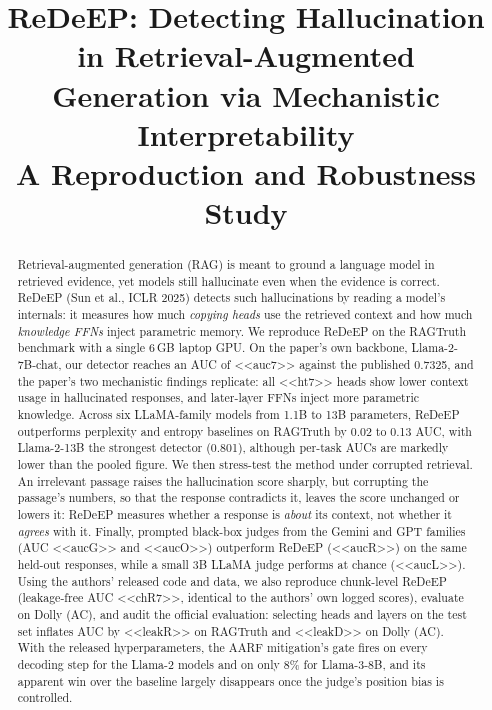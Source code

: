 \documentclass[conference]{IEEEtran}
\begin{document}
\title{ReDeEP: Detecting Hallucination in Retrieval-Augmented Generation via Mechanistic Interpretability\\[4pt]
\large A Reproduction and Robustness Study}

\author{
\and
{}
}

\maketitle

\begin{abstract}
Retrieval-augmented generation (RAG) is meant to ground a language model in retrieved evidence, yet models still hallucinate even when the evidence is correct. ReDeEP (Sun et al., ICLR 2025) detects such hallucinations by reading a model's internals: it measures how much \emph{copying heads} use the retrieved context and how much \emph{knowledge FFNs} inject parametric memory. We reproduce ReDeEP on the RAGTruth benchmark with a single 6\,GB laptop GPU. On the paper's own backbone, Llama-2-7B-chat, our detector reaches an AUC of <<auc7>> against the published 0.7325, and the paper's two mechanistic findings replicate: all <<ht7>> heads show lower context usage in hallucinated responses, and later-layer FFNs inject more parametric knowledge. Across six LLaMA-family models from 1.1B to 13B parameters, ReDeEP outperforms perplexity and entropy baselines on RAGTruth by 0.02 to 0.13 AUC, with Llama-2-13B the strongest detector (0.801), although per-task AUCs are markedly lower than the pooled figure. We then stress-test the method under corrupted retrieval. An irrelevant passage raises the hallucination score sharply, but corrupting the passage's numbers, so that the response contradicts it, leaves the score unchanged or lowers it: ReDeEP measures whether a response is \emph{about} its context, not whether it \emph{agrees} with it. Finally, prompted black-box judges from the Gemini and GPT families (AUC <<aucG>> and <<aucO>>) outperform ReDeEP (<<aucR>>) on the same held-out responses, while a small 3B LLaMA judge performs at chance (<<aucL>>). Using the authors' released code and data, we also reproduce chunk-level ReDeEP (leakage-free AUC <<chR7>>, identical to the authors' own logged scores), evaluate on Dolly (AC), and audit the official evaluation: selecting heads and layers on the test set inflates AUC by <<leakR>> on RAGTruth and <<leakD>> on Dolly (AC). With the released hyperparameters, the AARF mitigation's gate fires on every decoding step for the Llama-2 models and on only 8\% for Llama-3-8B, and its apparent win over the baseline largely disappears once the judge's position bias is controlled.
\end{abstract}
\end{document}
